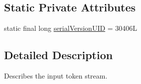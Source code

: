 \subsection*{Static Private Attributes}
\begin{DoxyCompactItemize}
\item 
static final long \hyperlink{classuk_1_1ac_1_1manchester_1_1cs_1_1owlapi_1_1dlsyntax_1_1parser_1_1_token_a5dea46cd395e4d7b437d067f84f34e69}{serial\-Version\-U\-I\-D} = 30406\-L
\end{DoxyCompactItemize}


\subsection{Detailed Description}
Describes the input token stream. 

